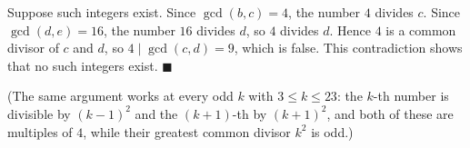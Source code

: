 Suppose such integers exist. Since $\gcd(b,c)=4$, the number $4$ divides $c$. Since $\gcd(d,e)=16$, the number $16$ divides $d$, so $4$ divides $d$. Hence $4$ is a common divisor of $c$ and $d$, so $4\mid\gcd(c,d)=9$, which is false. This contradiction shows that no such integers exist. $\blacksquare$

(The same argument works at every odd $k$ with $3\le k\le23$: the $k$-th number is divisible by $(k-1)^2$ and the $(k+1)$-th by $(k+1)^2$, and both of these are multiples of $4$, while their greatest common divisor $k^2$ is odd.)

